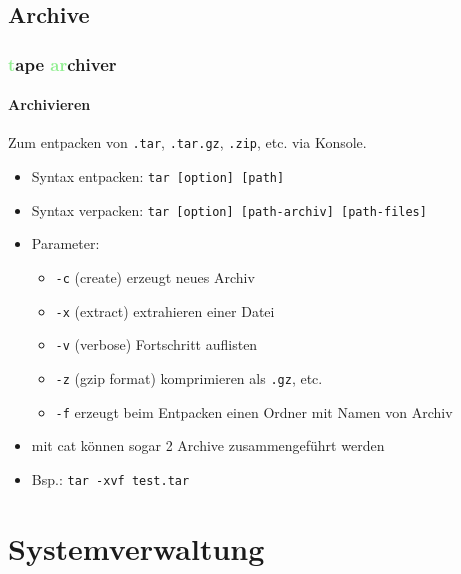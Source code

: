 \documentclass[12pt,utf8]{beamer}
\begin{document}
\subsection{Archive}
\begin{frame}
\frametitle{\textcolor{lightGreen}{t}ape \textcolor{lightGreen}{ar}chiver}
\framesubtitle{Archivieren}
Zum entpacken von \texttt{.tar}, \texttt{.tar.gz}, \texttt{.zip}, etc. via Konsole.
\begin{itemize}
	\item Syntax entpacken: \texttt{tar [option] [path]}
	\item Syntax verpacken: \texttt{tar [option] [path-archiv] [path-files]}
	\item Parameter:
	\begin{itemize}[<+->]
		\item {\scriptsize \texttt{-c} (create) erzeugt neues Archiv}
		\item {\scriptsize \texttt{-x} (extract) extrahieren einer Datei}
		\item {\scriptsize \texttt{-v} (verbose) Fortschritt auflisten}
		\item {\scriptsize \texttt{-z} (gzip format) komprimieren als \texttt{.gz}, etc.}
		\item {\scriptsize \texttt{-f} erzeugt beim Entpacken einen Ordner mit Namen von Archiv}
	\end{itemize}
	\item {\scriptsize mit cat können sogar 2 Archive zusammengeführt werden}
	\item Bsp.: \texttt{tar -xvf test.tar}
\end{itemize}
\end{frame}

\section{Systemverwaltung}
\end{document}
